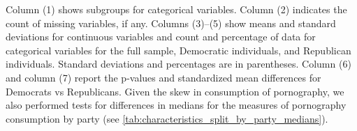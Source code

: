 \documentclass[12pt,twoside]{article}
\begin{document}
\begin{table}[!ht]
{		Column (1) shows subgroups for categorical variables.
		Column (2) indicates the count of missing variables, if any.
		Columns (3)--(5) show means and standard deviations for continuous variables and count and percentage of data for categorical variables for the full sample, Democratic individuals, and Republican individuals.
		Standard deviations and percentages are in parentheses.
		Column (6) and column (7) report the p-values and standardized mean differences for Democrats vs Republicans.
		Given the skew in consumption of pornography, we also performed tests for differences in medians for the measures of pornography consumption by party (see \cref{tab:characteristics_split_by_party_medians}).
	}
\end{table}


\end{document}
